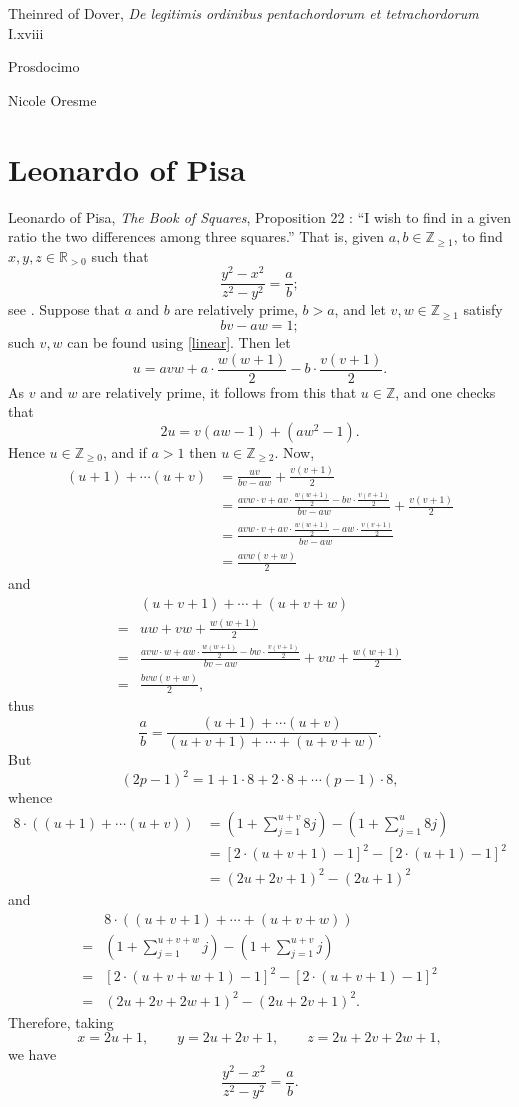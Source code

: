 \documentclass{article}
\begin{document}
Theinred of Dover, {\em De legitimis ordinibus pentachordorum et tetrachordorum} I.xviii \cite[pp.~176--181]{theinred}

Prosdocimo \cite{prosdocimo}

Nicole Oresme \cite{grant1966}





\section{Leonardo of Pisa}
Leonardo of Pisa, {\em The Book of Squares}, Proposition 22 \cite[p.~93]{sigler}: ``I wish to find in a given ratio the two differences among
three squares.'' That is, given $a,b \in \mathbb{Z}_{\geq 1}$,  to find $x,y,z \in \mathbb{R}_{>0}$
such that
\[
\frac{y^2-x^2}{z^2-y^2}=\frac{a}{b};
\]
see \cite[p.~101]{sigler}.
Suppose that $a$ and $b$ are relatively prime, $b>a$, and let $v,w \in \mathbb{Z}_{\geq 1}$ 
satisfy
\[
bv-aw=1;
\]
such $v,w$ can be found using \eqref{linear}.
Then let
\[
u= avw+a\cdot \frac{w(w+1)}{2} - b\cdot \frac{v(v+1)}{2}.
\]
As
$v$ and $w$ are relatively prime, it follows from this that
$u \in \mathbb{Z}$, and one checks that
\[
2u = v(aw-1) + (aw^2-1).
\]
Hence $u \in \mathbb{Z}_{\geq 0}$, and if $a > 1$ then 
$u \in \mathbb{Z}_{\geq 2}$. 
Now,
\begin{align*}
(u+1)+\cdots(u+v)&
=\frac{uv}{bv-aw}+\frac{v(v+1)}{2}\\
&=\frac{avw\cdot v + av \cdot   \frac{w(w+1)}{2} - bv \cdot \frac{v(v+1)}{2}}{bv-aw}
+\frac{v(v+1)}{2}\\
&=\frac{avw\cdot v +av\cdot \frac{w(w+1)}{2}-aw\cdot \frac{v(v+1)}{2}}{bv-aw}\\
&=\frac{avw(v+w)}{2}
\end{align*}
and
\[
\begin{split}
&(u+v+1)+\cdots+(u+v+w)\\
=&uw+vw+\frac{w(w+1)}{2}\\
=&\frac{avw\cdot w+aw\cdot \frac{w(w+1)}{2}-bw\cdot
\frac{v(v+1)}{2}}{bv-aw} +vw+\frac{w(w+1)}{2}\\
=&\frac{bvw(v+w)}{2},
\end{split}
\]
thus
\[
\frac{a}{b} = \frac{(u+1)+\cdots(u+v)}{(u+v+1)+\cdots+(u+v+w)}.
\]
But
\[
(2p-1)^2 = 1 + 1\cdot 8 + 2\cdot 8 + \cdots (p-1) \cdot 8,
\]
whence
\begin{align*}
8\cdot \left( (u+1)+\cdots(u+v)\right) &= \left(1+ \sum_{j=1}^{u+v} 8 j\right) - \left(1+ \sum_{j=1}^u 8 j\right)\\
&= [2\cdot (u+v+1)-1]^2 - [2 \cdot (u+1)-1]^2\\
&=(2u+2v+1)^2 - (2u+1)^2
\end{align*}
and
\[
\begin{split}
&8\cdot ((u+v+1)+\cdots+(u+v+w))\\
=& \left(1+\sum_{j=1}^{u+v+w} j \right) - \left( 1 + \sum_{j=1}^{u+v} j \right)\\
=&[2\cdot (u+v+w+1)-1]^2 - [2\cdot(u+v+1)-1]^2\\
=&(2u+2v+2w+1)^2 - (2u+2v+1)^2.
\end{split}
\]
Therefore, taking
\[
x = 2u+1,\qquad y = 2u+2v+1,\qquad z = 2u+2v+2w+1,
\]
we have
\[
\frac{y^2-x^2}{z^2-y^2} = \frac{a}{b}.
\]
\end{document}
